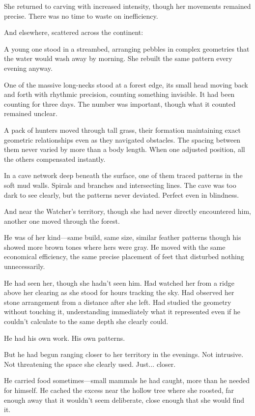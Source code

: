 She returned to carving with increased intensity, though her movements remained precise. There was no time to waste on inefficiency.

\scenebreak

And elsewhere, scattered across the continent:

A young one stood in a streambed, arranging pebbles in complex geometries that the water would wash away by morning. She rebuilt the same pattern every evening anyway.

One of the massive long-necks stood at a forest edge, its small head moving back and forth with rhythmic precision, counting something invisible. It had been counting for three days. The number was important, though what it counted remained unclear.

A pack of hunters moved through tall grass, their formation maintaining exact geometric relationships even as they navigated obstacles. The spacing between them never varied by more than a body length. When one adjusted position, all the others compensated instantly.

In a cave network deep beneath the surface, one of them traced patterns in the soft mud walls. Spirals and branches and intersecting lines. The cave was too dark to see clearly, but the patterns never deviated. Perfect even in blindness.

\scenebreak

And near the Watcher's territory, though she had never directly encountered him, another one moved through the forest.

He was of her kind—same build, same size, similar feather patterns though his showed more brown tones where hers were gray. He moved with the same economical efficiency, the same precise placement of feet that disturbed nothing unnecessarily.

He had seen her, though she hadn't seen him. Had watched her from a ridge above her clearing as she stood for hours tracking the sky. Had observed her stone arrangement from a distance after she left. Had studied the geometry without touching it, understanding immediately what it represented even if he couldn't calculate to the same depth she clearly could.

He had his own work. His own patterns.

But he had begun ranging closer to her territory in the evenings. Not intrusive. Not threatening the space she clearly used. Just... closer.

He carried food sometimes—small mammals he had caught, more than he needed for himself. He cached the excess near the hollow tree where she roosted, far enough away that it wouldn't seem deliberate, close enough that she would find it.

